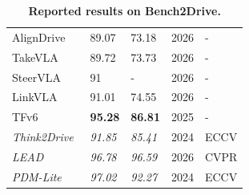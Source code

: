 \documentclass[10pt,twocolumn,letterpaper]{article}
\begin{document}
\begin{table}[t]
\begin{tabular}{l|ll|ll}
AlignDrive~\cite{Wu2026ARXIV} & 89.07 & 73.18 & 2026 & - \\
TakeVLA~\cite{Gao2026ARXIV} & 89.72 & 73.73 & 2026 & - \\
SteerVLA~\cite{Gao2026ARXIV} & 91 & - & 2026 & - \\
LinkVLA~\cite{Wang2026ARXIV} & 91.01 & 74.55 & 2026 & - \\
TFv6~\cite{Nguyen2026CVPR} & \textbf{95.28} & \textbf{86.81} & 2025 & - \\
\midrule
\textit{Think2Drive}~\cite{Li2024ECCV} & \textit{91.85} & \textit{85.41} & 2024 & ECCV \\
\textit{LEAD}~\cite{Nguyen2026CVPR} & \textit{96.78} & \textit{96.59} & 2026 & CVPR \\
\textit{PDM-Lite}~\cite{Sima2024ECCV} & \textit{97.02} & \textit{92.27} & 2024 & ECCV \\
\bottomrule
\end{tabular}
\caption{\textbf{Reported results on Bench2Drive.}}
\label{tab:b2d}
\end{table}


\clearpage


{
    \small
    
    
}
\end{document}
